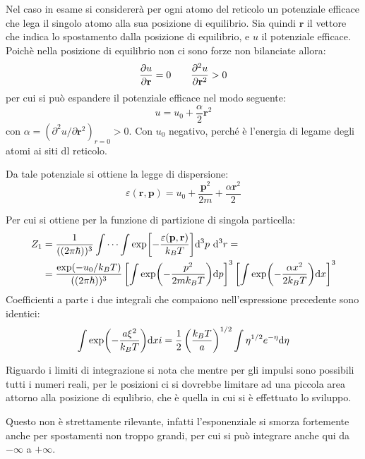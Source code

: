 Nel caso in esame si considererà per ogni atomo del reticolo un potenziale efficace che lega il singolo atomo alla sua posizione di equilibrio.
Sia quindi $ \textbf{r} $ il vettore che indica lo spostamento dalla posizione di equilibrio, e $ u $ il potenziale efficace.
Poichè nella posizione di equilibrio non ci sono forze non bilanciate allora:
\begin{equation*}
	\frac{\partial {u}}{\partial {\textbf{\textbf{r}}}} = 0	\qquad	\frac{\partial {^2 u}}{\partial {\textbf{\textbf{r}}^2}} > 0
\end{equation*}
per cui si può espandere il potenziale efficace nel modo seguente:
\begin{equation*}
	u = u_0 + \frac{\alpha}{2} \textbf{r}^2
\end{equation*}
con $ \alpha = (\partial^2 u / \partial \textbf{r}^2)_{r=0} > 0 $. Con $ u_0 $ negativo, perché è l'energia di legame degli atomi ai siti dl reticolo.

Da tale potenziale si ottiene la legge di dispersione:
\begin{equation*}
	\varepsilon(\textbf{r}, \textbf{p}) = u_0 + \frac{\textbf{p}^2}{2m} + \frac{\alpha\textbf{r}^2}{2}
\end{equation*}

Per cui si ottiene per la funzione di partizione di singola particella:
\begin{align*}
	Z_1 &= \frac{1}{((2\pi \hbar))^3} \int \cdots \int \exp[-\frac{\varepsilon(\textbf{p},\textbf{r})}{k_B T}] \dd^3 p ~\dd^3 r =\\
	&= \frac{\exp(-u_0/k_B T)}{((2\pi \hbar))^3} \left[\int \exp(- \frac{p^2}{2 m k_B T})\dd p\right]^3\left[\int \exp(- \frac{\alpha x^2}{2 k_B T}) \dd x\right]^3
\end{align*}
Coefficienti a parte i due integrali che compaiono nell'espressione precedente sono identici:
\begin{equation*}
\int \exp(- \frac{a \xi^2}{k_B T}) \dd xi = \frac{1}{2} \left(\frac{k_B T}{a}\right)^{1/2} \int \eta^{1/2} e^{-\eta} \dd \eta
\end{equation*}

Riguardo i limiti di integrazione si nota che mentre per gli impulsi sono possibili tutti i numeri reali, per le posizioni ci si dovrebbe limitare ad una piccola area attorno alla posizione di equlibrio, che è quella in cui si è effettuato lo sviluppo.

Questo non è strettamente rilevante, infatti l'esponenziale si smorza fortemente anche per spostamenti non troppo grandi, per cui si può integrare anche qui da $ - \infty $ a $ + \infty $.

